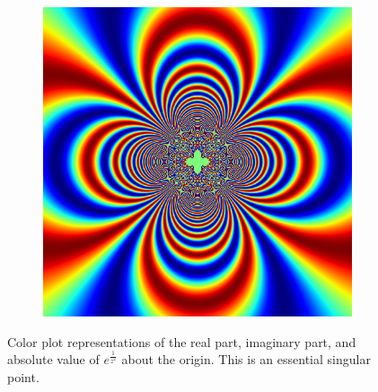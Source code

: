 \begin{figure}
\begin{subfigure}{.32\textwidth}
\end{subfigure}
\begin{subfigure}{.32\textwidth}
\includegraphics[width=\textwidth]{exp_inv2_abs.png}
\end{subfigure}
\caption{Color plot representations of the real part, imaginary part, and absolute value of $e^{\frac{1}{z^2}}$ about the origin.
This is an essential singular point.}
\label{fig:exp_inv2_color}
\end{figure}

